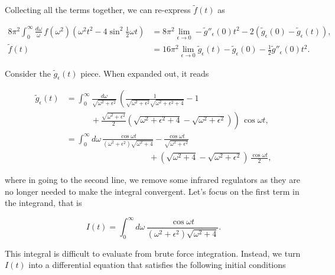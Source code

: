 \documentclass{article}
\numberwithin{equation}{section} %
\begin{document}
\noindent Collecting all the terms together, we can re-express $\tilde{f}(t)$ as 

\begin{equation}
\begin{split}
8\pi^2\int^\infty_0 \frac{d\omega}{\omega}\, f(\omega^2)(\omega^2 t^2 - 4 \sin^2 \frac{1}{2}\omega t) &= 8\pi^2 \lim_{\epsilon\rightarrow 0} - \tilde{g}''_\epsilon(0)t^2 - 2(\tilde{g}_\epsilon(0)-\tilde{g}_\epsilon(t)),\\
\tilde{f}(t)&= 16\pi^2 \lim_{\epsilon\rightarrow 0}\tilde{g}_\epsilon(t) - \tilde{g}_\epsilon(0) - \frac{1}{2} \tilde{g}''_\epsilon(0)t^2.
\end{split}
\label{ftilde}
\end{equation}

Consider the $\tilde{g}_\epsilon(t)$ piece. When expanded out, it reads

\begin{equation}
\begin{split}
\tilde{g}_\epsilon(t) &= \int^\infty_0 \frac{d\omega}{\sqrt{\omega^2+\epsilon^2}}\, \left( \frac{1}{\sqrt{\omega^2+\epsilon^2}\sqrt{\omega^2+\epsilon^2+4}} - 1 \right. \\
&\quad \quad \quad + \left.\frac{\sqrt{\omega^2+\epsilon^2}}{2}(\sqrt{\omega^2+\epsilon^2+4} - \sqrt{\omega^2+\epsilon^2}) \right) \, \cos\omega t,\\
&= \int^\infty_0 d\omega\, \frac{\cos\omega t}{(\omega^2+\epsilon^2)\sqrt{\omega^2+4}} - \frac{\cos \omega t}{\sqrt{\omega^2+\epsilon^2}}  \\
&\quad \quad \quad \quad \quad \quad \quad \quad \quad \quad  + (\sqrt{\omega^2+4} - \sqrt{\omega^2+\epsilon^2}) \, \frac{\cos \omega t}{2},
\end{split}
\label{g_epsilon}
\end{equation}

\noindent where in going to the second line, we remove some infrared regulators as they are no longer needed to make the integral convergent. Let's focus on the first term in the integrand, that is

\begin{equation}
I(t) = \int^\infty_0 d\omega\, \frac{\cos \omega t}{(\omega^2+\epsilon^2)\sqrt{\omega^2+4}}.
\end{equation}

\noindent This integral is difficult to evaluate from brute force integration. Instead, we turn $I(t)$ into a differential equation that satisfies the following initial conditions
\end{document}
